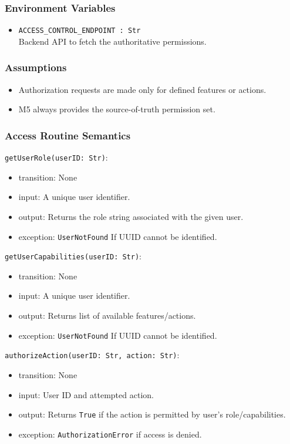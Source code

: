 \documentclass[12pt, titlepage]{article}
\begin{document}
\subsubsection{Environment Variables}

\begin{itemize}
    \item \texttt{ACCESS\_CONTROL\_ENDPOINT : Str}\\
    Backend API to fetch the authoritative permissions.
\end{itemize}

\subsubsection{Assumptions}

\begin{itemize}
    \item Authorization requests are made only for defined features or actions.
    \item M5 always provides the source-of-truth permission set.
\end{itemize}

\subsubsection{Access Routine Semantics}

\noindent \texttt{getUserRole(userID: Str)}:
\begin{itemize}
\item transition: None
\item input: A unique user identifier.
\item output: Returns the role string associated with the given user.
\item exception: \texttt{UserNotFound} If UUID cannot be identified.
\end{itemize}

\noindent \texttt{getUserCapabilities(userID: Str)}:
\begin{itemize}
\item transition: None
\item input: A unique user identifier.
\item output: Returns list of available features/actions.
\item exception: \texttt{UserNotFound} If UUID cannot be identified.
\end{itemize}

\noindent \texttt{authorizeAction(userID: Str, action: Str)}:
\begin{itemize}
\item transition: None
\item input: User ID and attempted action.
\item output: Returns \texttt{True} if the action is permitted by user's role/capabilities.
\item exception: \texttt{AuthorizationError}  if access is denied.
\end{itemize}
\end{document}
